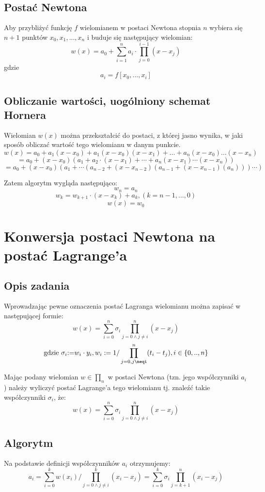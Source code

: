 \documentclass{article}
\begin{document}
\subsection{Postać Newtona}
Aby przybliżyć funkcję $f$ wielomianem w postaci Newtona stopnia $n$ wybiera się $n+1$ punktów $ x_{0}, x_{1},  ..., x_{n}$ i buduje się następujący wielomian: 
$$ w(x) = a_{0} +  \sum_{i=1}^n a_{i} \cdot\prod_{j=0}^{i-1} (x-x_{j})$$
gdzie 
$$ a_{i} = f[x_{0}, \ldots, x_{i}]$$

\subsection{Obliczanie wartości, uogólniony schemat Hornera}
Wielomian $w(x)$ można przekształcić do postaci, z której jasno wynika, w jaki sposób obliczać wartość tego wielomianu w danym punkcie.
$$w(x) = a_{0} + a_{1}(x-x_{0}) + a_{1}(x-x_{0})(x-x_{1}) + \ldots + a_{n}(x - x_{0})\ldots(x-x_{n})$$
$$= a_{0} + (x-x_{0})(a_{1} + a_{2}\cdot(x-x_{1})+\cdots+a_{n}(x-x_{1})\cdots(x-x_{n}))$$
$$= a_{0} + (x-x_{0})(a_{1} + \cdots (a_{n-2} + (x-x_{n-2})(a_{n-1} + (x-x_{n-1})(a_{n})))\cdots)$$

Zatem algorytm wygląda następująco: 
$$w_{n} = a_{n}$$
$$w_{k} = w_{k+1}\cdot(x-x_{k}) + a_{k}, (k=n-1,\ldots,0)$$
$$w(x) = w_{0}$$

\section{Konwersja postaci Newtona na postać Lagrange'a}
\subsection{Opis zadania}

Wprowadzając pewne oznaczenia postać Lagranga wielomianu można zapisać w następującej formie: 
$$w(x) = \sum_{i=0}^n\sigma_{i}\prod_{j=0 \wedge j\neq i}^n(x-x_{j})$$
$$\text{gdzie } \sigma_{i}\text{:=} w_{i}\cdot y_{i},  w_{i}:=1/\prod_{j=0,j\neqi}^n(t_{i}-t_{j}), i\in \{0,..,n\}$$

Mając podany wielomian $w \in \prod_{n}$ w postaci Newtona (tzn. jego współczynniki $a_{i}$) należy wyliczyć postać Lagrange'a tego wielomianu tj. znaleźć takie współczynniki $\sigma_{i}$, że: 
$$w(x) = \sum_{i=0}^n\sigma_{i}\prod_{j=0 \wedge j\neq i}^n(x-x_{j})$$
\subsection{Algorytm}
Na podstawie definicji współczynników $a_{i}$ otrzymujemy:
$$ a_{i} = \sum_{i=0}^k w(x_{i})/\prod_{j=0 \wedge j\neq i}^k (x_{i} - x_{j}) = \sum_{i=0}^k \sigma_{i} \prod_{j=k+1}^n(x_{i}-x_{j})$$
\end{document}
